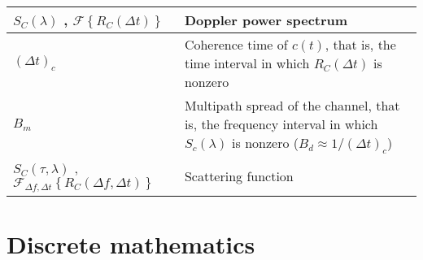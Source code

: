 \documentclass{article}
\begin{document}
\begin{xltabular}{\textwidth}{XX}
	\(S_C(\lambda)\) \cite{proakisDigitalCommunications2007}, \(\mathcal{F}\left\{ R_C (\Delta t) \right\}\) \cite{goldsmithWirelessCommunications2005}                                                                                            & Doppler power spectrum                                                                                                                                              \\ \hline
	\((\Delta t)_c\)                                                                                                                                        & Coherence time of \(c(t)\), that is, the time interval in which \(R_C(\Delta t)\) is nonzero \cite{proakisDigitalCommunications2007}                                                                        \\ \hline
	\(B_m\)                                                                                                                                                 & Multipath spread of the channel, that is, the frequency interval in which \(S_c(\lambda)\) is nonzero (\(B_d \approx 1/(\Delta t)_c \)) \cite{proakisDigitalCommunications2007}                             \\ \hline
	\(S_C(\tau, \lambda)\) \cite{proakisDigitalCommunications2007}, \(\mathcal{F}_{\Delta f, \Delta t}\left\{ R_C (\Delta f, \Delta t) \right\}\) \cite{goldsmithWirelessCommunications2005}                                                       & Scattering function                                                                                                                                                 \\ \hline
\end{xltabular}

\section{Discrete mathematics}
\end{document}
